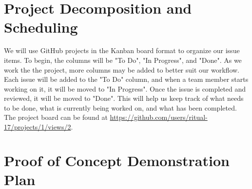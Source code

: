 \documentclass{article}
\begin{document}


\section{Project Decomposition and Scheduling}

  
  We will use GitHub projects in the Kanban board format to organize our issue items. To begin, the columns will be "To Do", "In Progress", 
  and "Done". As we work the the project, more columns may be added to better suit our workflow. Each issue will be added to the "To Do" column,
  and when a team member starts working on it, it will be moved to "In Progress". Once the issue is completed and reviewed, it will be moved to
  "Done". This will help us keep track of what needs to be done, what is currently being worked on, and what has been completed. The project 
  board can be found at \url{https://github.com/users/ritual-17/projects/1/views/2}.
  



\section{Proof of Concept Demonstration Plan}
\end{document}
